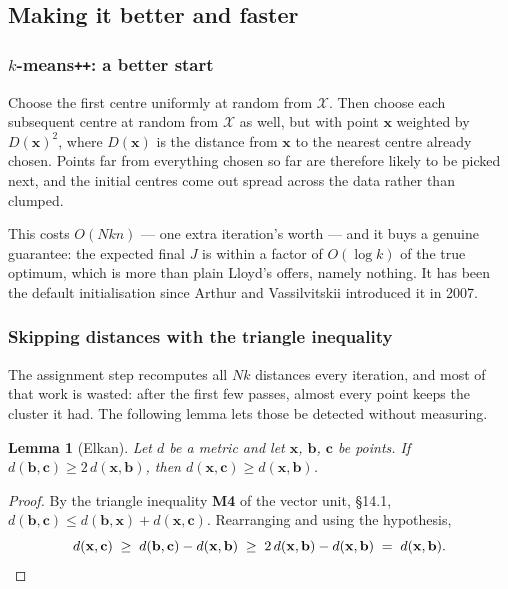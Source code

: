 \documentclass[11pt]{article}
\theoremstyle{plain}
\newtheorem{lem}[thm]{Lemma}
\theoremstyle{definition}
\theoremstyle{remark}
\newcommand{\vc}[1]{\mathbf{#1}}
\newcommand{\X}{\mathcal{X}}
\begin{document}
\subsection{Making it better and faster}
\subsubsection*{$k$-means\texttt{++}: a better start}
Choose the first centre uniformly at random from $\X$. Then choose each
subsequent centre at random from $\X$ as well, but with point $\vc{x}$ weighted
by $D(\vc{x})^{2}$, where $D(\vc{x})$ is the distance from $\vc{x}$ to the
nearest centre already chosen. Points far from everything chosen so far are
therefore likely to be picked next, and the initial centres come out spread
across the data rather than clumped.

This costs $O(Nkn)$ --- one extra iteration's worth --- and it buys a genuine
guarantee: the expected final $J$ is within a factor of $O(\log k)$ of the true
optimum, which is more than plain Lloyd's offers, namely nothing. It has been
the default initialisation since Arthur and Vassilvitskii introduced it in 2007.

\subsubsection*{Skipping distances with the triangle inequality}
The assignment step recomputes all $Nk$ distances every iteration, and most of
that work is wasted: after the first few passes, almost every point keeps the
cluster it had. The following lemma lets those be detected without measuring.

\begin{lem}[Elkan]
Let $d$ be a metric and let $\vc{x}$, $\vc{b}$, $\vc{c}$ be points. If
$d(\vc{b},\vc{c}) \ge 2\,d(\vc{x},\vc{b})$, then
$d(\vc{x},\vc{c}) \ge d(\vc{x},\vc{b})$.
\end{lem}

\begin{proof}
By the triangle inequality \textbf{M4} of the vector unit, \S14.1,
$d(\vc{b},\vc{c}) \le d(\vc{b},\vc{x}) + d(\vc{x},\vc{c})$. Rearranging and
using the hypothesis,
\[
  d(\vc{x},\vc{c}) \;\ge\; d(\vc{b},\vc{c}) - d(\vc{x},\vc{b})
                   \;\ge\; 2\,d(\vc{x},\vc{b}) - d(\vc{x},\vc{b})
                   \;=\; d(\vc{x},\vc{b}) . \qedhere
\]
\end{proof}
\end{document}
